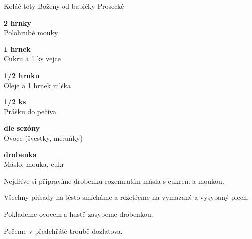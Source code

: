\documentclass[11pt,a4paper]{article}
\begin{document}
\begin{recipe}[Plum]{Koláč tety Boženy od babičky Prosecké}
    \begin{ingredients}
        \item \parbox[t]{\linewidth}{\raggedright \piece \textbf{2 hrnky}\\ Polohrubé mouky}
        \item \parbox[t]{\linewidth}{\raggedright \piece \textbf{1 hrnek}\\ Cukru a 1 ks vejce}
        \item \parbox[t]{\linewidth}{\raggedright \liquid \textbf{1/2 hrnku}\\ Oleje a 1 hrnek mléka}
        \item \parbox[t]{\linewidth}{\raggedright \piece \textbf{1/2 ks}\\ Prášku do pečiva}
        \item \parbox[t]{\linewidth}{\raggedright \indefinite \textbf{dle sezóny}\\ Ovoce (švestky, meruňky)}
        \item \parbox[t]{\linewidth}{\raggedright \piece \textbf{drobenka}\\ Máslo, mouka, cukr}
    \end{ingredients}
    \begin{steps}
        \item Nejdříve si připravíme drobenku rozemnutím másla s cukrem a moukou.
        \item Všechny přísady na těsto smícháme a rozetřeme na vymazaný a vysypaný plech.
        \item Poklademe ovocem a hustě zasypeme drobenkou.
        \item Pečeme v předehřáté troubě dozlatova.
    \end{steps}
\end{recipe}
\end{document}
